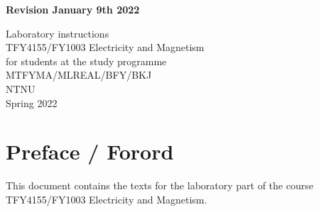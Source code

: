 \documentclass[../Elmag-labhefte-2022.tex]{subfiles}
\begin{document}
{
\centering
\bfseries
\hfill Revision January 9th 2022

\vspace*{40mm}
\LARGE Laboratory instructions\\[10mm]
TFY4155/FY1003 Electricity and Magnetism\\[20mm]    
for students at the study programme\\[10mm]    
MTFYMA/MLREAL/BFY/BKJ \\[15mm]    
NTNU\\[15mm]    
Spring 2022

}


\newpage
\chapter*{Preface / Forord}

This document contains the texts for the laboratory part of the course TFY4155/FY1003 Electricity and Magnetism.




\end{document}
